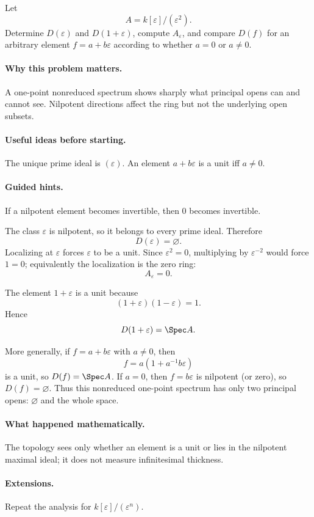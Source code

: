 \begin{problem}
Let
\[
A=k[\varepsilon]/(\varepsilon^2).
\]
Determine $D(\varepsilon)$ and $D(1+\varepsilon)$, compute $A_\varepsilon$, and compare
$D(f)$ for an arbitrary element $f=a+b\varepsilon$ according to whether $a=0$ or $a\neq0$.
\end{problem}

\paragraph{Why this problem matters.}
A one-point nonreduced spectrum shows sharply what principal opens can and cannot see.
Nilpotent directions affect the ring but not the underlying open subsets.

\paragraph{Useful ideas before starting.}
The unique prime ideal is $(\varepsilon)$.  An element $a+b\varepsilon$ is a unit iff
$a\neq0$.

\paragraph{Guided hints.}
If a nilpotent element becomes invertible, then $0$ becomes invertible.

\begin{solution}
The class $\varepsilon$ is nilpotent, so it belongs to every prime ideal.  Therefore
\[
D(\varepsilon)=\varnothing.
\]
Localizing at $\varepsilon$ forces $\varepsilon$ to be a unit.  Since
$\varepsilon^2=0$, multiplying by $\varepsilon^{-2}$ would force $1=0$; equivalently the
localization is the zero ring:
\[
A_\varepsilon=0.
\]

The element $1+\varepsilon$ is a unit because
\[
(1+\varepsilon)(1-\varepsilon)=1.
\]
Hence
\[
D(1+\varepsilon)=\Spec A.
\]

More generally, if $f=a+b\varepsilon$ with $a\neq0$, then
\[
f=a\left(1+a^{-1}b\varepsilon\right)
\]
is a unit, so $D(f)=\Spec A$.  If $a=0$, then $f=b\varepsilon$ is nilpotent (or zero), so
$D(f)=\varnothing$.  Thus this nonreduced one-point spectrum has only two principal opens:
$\varnothing$ and the whole space.
\end{solution}

\paragraph{What happened mathematically.}
The topology sees only whether an element is a unit or lies in the nilpotent maximal ideal;
it does not measure infinitesimal thickness.

\paragraph{Extensions.}
Repeat the analysis for $k[\varepsilon]/(\varepsilon^n)$.
